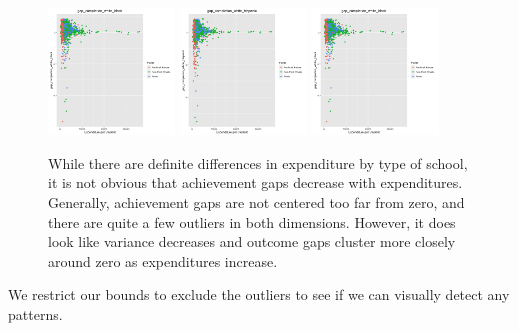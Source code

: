\documentclass{article}
\begin{document}
\begin{figure}[H]
\centering
\includegraphics[width=0.3\textwidth]{../images/eda_scatterplots/gap_completion_white_black.png}
\includegraphics[width=0.3\textwidth]{../images/eda_scatterplots/gap_completion_white_hispanic.png}
\includegraphics[width=0.3\textwidth]{../images/eda_scatterplots/gap_completion_white_black.png}
\caption{\label{fig:Completion Rates} While there are definite differences in expenditure by type of school, it is not obvious that achievement gaps decrease with expenditures. Generally, achievement gaps are not centered too far from zero, and there are quite a few outliers in both dimensions. However, it does look like variance decreases and outcome gaps cluster more closely around zero as expenditures increase.}
\end{figure}

We restrict our bounds to exclude the outliers to see if we can visually detect any patterns.
\end{document}
